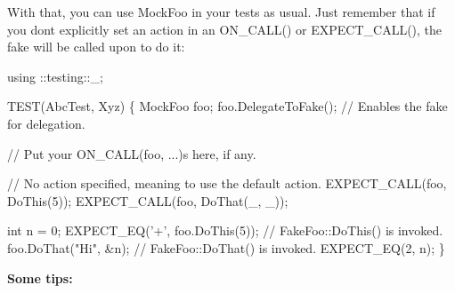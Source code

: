 With that, you can use {\ttfamily Mock\+Foo} in your tests as usual. Just remember that if you don\textquotesingle{}t explicitly set an action in an {\ttfamily O\+N\+\_\+\+C\+A\+L\+L()} or {\ttfamily E\+X\+P\+E\+C\+T\+\_\+\+C\+A\+L\+L()}, the fake will be called upon to do it\+:


\begin{DoxyCode}
using ::testing::\_;

TEST(AbcTest, Xyz) \{
  MockFoo foo;
  foo.DelegateToFake(); \textcolor{comment}{// Enables the fake for delegation.}

  \textcolor{comment}{// Put your ON\_CALL(foo, ...)s here, if any.}

  \textcolor{comment}{// No action specified, meaning to use the default action.}
  EXPECT\_CALL(foo, DoThis(5));
  EXPECT\_CALL(foo, DoThat(\_, \_));

  \textcolor{keywordtype}{int} n = 0;
  EXPECT\_EQ(\textcolor{charliteral}{'+'}, foo.DoThis(5));  \textcolor{comment}{// FakeFoo::DoThis() is invoked.}
  foo.DoThat(\textcolor{stringliteral}{"Hi"}, &n);           \textcolor{comment}{// FakeFoo::DoThat() is invoked.}
  EXPECT\_EQ(2, n);
\}
\end{DoxyCode}


{\bfseries Some tips\+:}


